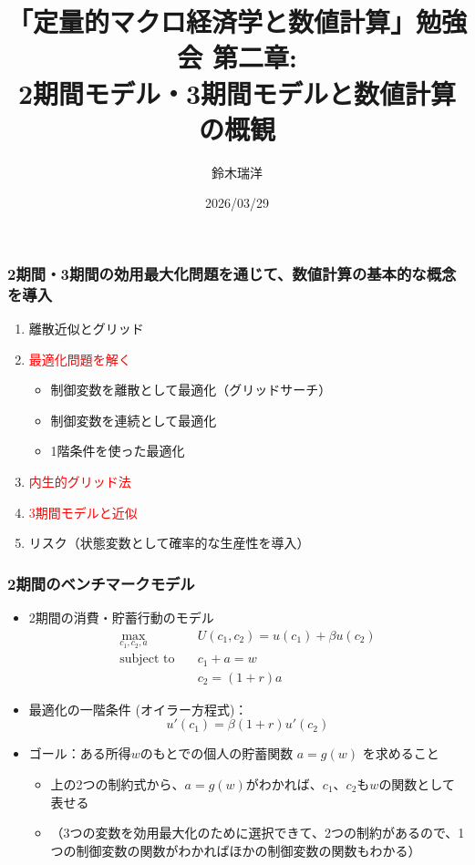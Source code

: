 \documentclass[unicode,9pt]{beamer}%
\title{「定量的マクロ経済学と数値計算」勉強会 第二章: \\ 2期間モデル・3期間モデルと数値計算の概観}
\author{鈴木瑞洋}
\date{2026/03/29}
\begin{document}
\begin{frame}
\titlepage
\end{frame}

\begin{frame}\frametitle{2期間・3期間の効用最大化問題を通じて、数値計算の基本的な概念を導入}
  \begin{enumerate}
      \item 離散近似とグリッド
      \item \textcolor{red}{最適化問題を解く}
        \begin{itemize}
            \item 制御変数を離散として最適化（グリッドサーチ）
            \item 制御変数を連続として最適化
            \item 1階条件を使った最適化
        \end{itemize}
      \item \textcolor{red}{内生的グリッド法}
      \item \textcolor{red}{3期間モデルと近似}
      \item リスク（状態変数として確率的な生産性を導入）
  \end{enumerate}
\end{frame}

\begin{frame}\frametitle{2期間のベンチマークモデル}
  \begin{itemize}
      \item 2期間の消費・貯蓄行動のモデル
        \begin{align*}
          \max_{c_1, c_2, a} &U(c_1, c_2) = u(c_1) + \beta u(c_2) \\
          \text{subject to} \quad
          &c_1 + a = w \\
          &c_2 = (1 + r) a
        \end{align*}
      \item 最適化の一階条件 (オイラー方程式)：
        $$
        u'(c_1) = \beta (1 + r) u'(c_2)
        $$
      \item ゴール：ある所得$w$のもとでの個人の貯蓄関数 $a = g(w)$ を求めること
        \begin{itemize}
          \item 上の2つの制約式から、$a = g(w)$がわかれば、$c_1$、$c_2$も$w$の関数として表せる
          \item （3つの変数を効用最大化のために選択できて、2つの制約があるので、1つの制御変数の関数がわかればほかの制御変数の関数もわかる）
        \end{itemize}
  \end{itemize}
\end{frame}
\end{document}
